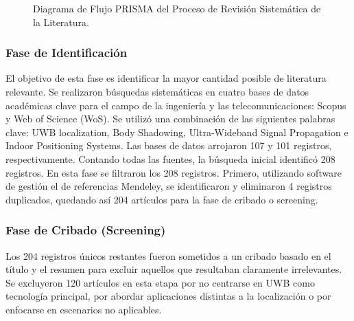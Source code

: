 \begin{figure}[t]
    \caption{Diagrama de Flujo PRISMA del Proceso de Revisión Sistemática de la Literatura.}
    \label{fig:prisma_flow}
\end{figure}

\subsubsection{Fase de Identificación}
El objetivo de esta fase es identificar la mayor cantidad posible de literatura relevante. Se realizaron búsquedas sistemáticas en cuatro bases de datos académicas clave para el campo de la ingeniería y las telecomunicaciones: Scopus y Web of Science (WoS). Se utilizó una combinación de las siguientes palabras clave: UWB localization, Body Shadowing, Ultra-Wideband Signal Propagation e Indoor Positioning Systems. Las bases de datos arrojaron 107 y 101 registros, respectivamente. Contando todas las fuentes, la búsqueda inicial identificó 208 registros. En esta fase se filtraron los 208 registros. Primero, utilizando software de gestión el de referencias Mendeley, se identificaron y eliminaron 4 registros duplicados, quedando así 204 artículos para la fase de cribado o screening. 

\subsubsection{Fase de Cribado (Screening)}
 Los 204 registros únicos restantes fueron sometidos a un cribado basado en el título y el resumen para excluir aquellos que resultaban claramente irrelevantes. Se excluyeron 120 artículos en esta etapa por no centrarse en UWB como tecnología principal, por abordar  aplicaciones distintas a la localización o por enfocarse en escenarios no aplicables.

